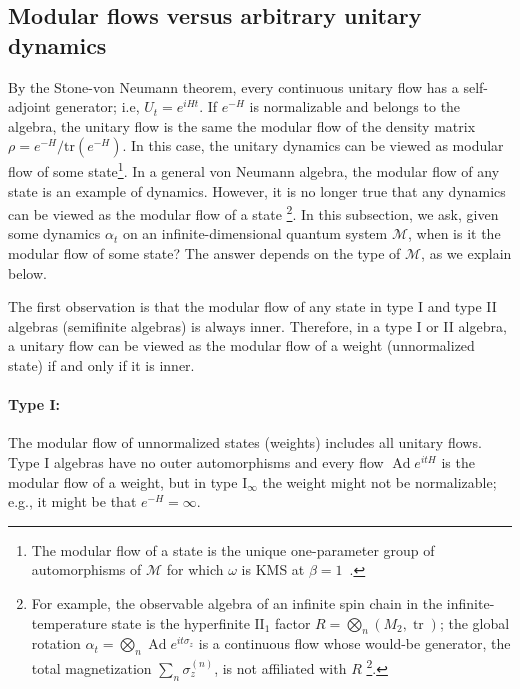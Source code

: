 \documentclass[a4paper,11pt]{article}
\theoremstyle{definition}
\newcommand{\mM}{\mathcal{M}}
\newcommand{\tr}{\text{tr}}
\begin{document}
\subsection{Modular flows versus arbitrary unitary dynamics}\label{sec:modular-vs-dynamics}

By the Stone-von Neumann theorem, every continuous unitary flow has a self-adjoint generator; i.e, $U_t=e^{i H t}$. If $e^{-H}$ is normalizable and belongs to the algebra, the unitary flow is the same the modular flow of the density matrix $\rho=e^{-H}/\tr(e^{-H})$. In this case, the unitary dynamics can be viewed as modular flow of some state\footnote{The modular flow of a state is the unique one-parameter group of automorphisms of $\mM$ for which $\omega$ is KMS at $\beta=1$~\cite{Takesaki1970}.}. In a general von Neumann algebra, the modular flow of any state is an example of dynamics. However, it is no longer true that any dynamics can be viewed as the modular flow of a state \footnote{For example, the observable algebra of an infinite spin chain in the infinite-temperature state is the hyperfinite $\mathrm{II}_1$ factor $R=\bigotimes_n(M_2,\operatorname{tr})$; the global rotation $\alpha_t=\bigotimes_n\operatorname{Ad}e^{it\sigma_z}$ is a continuous flow whose would-be generator, the total magnetization $\sum_n\sigma_z^{(n)}$, is not affiliated with $R$ \footnote{This flow is outer for all $t\notin\pi\mathbb Z$, since $\bigotimes_n\operatorname{Ad}u_n$ is inner iff $\sum_n(1-|\operatorname{tr}u_n|)<\infty$ and here $|\operatorname{tr}e^{it\sigma_z}|=|\cos t|$.}.}. In this subsection, we ask, given some dynamics $\alpha_t$ on an infinite-dimensional quantum system $\mM$, when is it the modular flow of some state? The answer depends on the type of $\mM$, as we explain below.

The first observation is that the modular flow of any state in type I and type II algebras (semifinite algebras) is always inner. 
Therefore, in a type I or II algebra, a unitary flow can be viewed as the modular flow of a weight (unnormalized state) if and only if it is inner. 

\paragraph{Type I:} The modular flow of unnormalized states (weights) includes all unitary flows.
Type I algebras have no outer automorphisms and every flow $\operatorname{Ad}e^{itH}$ is the modular flow of a weight, but in type I$_\infty$ the weight might not be normalizable; e.g., it might be that $e^{-H}=\infty$.
\end{document}
